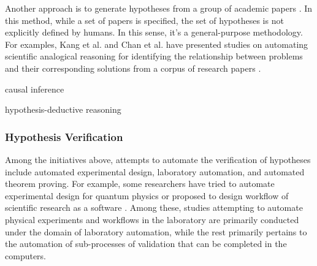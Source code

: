 \documentclass{article}
\begin{document}


Another approach is to generate hypotheses from a group of academic papers \cite{kang2022augmenting,chan2018solvent,wang2023learning,xu2023exploring,yang2023large}. In this method, while a set of papers is specified, the set of hypotheses is not explicitly defined by humans. In this sense, it's a general-purpose methodology. For examples, Kang et al. and Chan et al. have presented studies on automating scientific analogical reasoning for identifying the relationship between problems and their corresponding solutions from a corpus of research papers \cite{kang2022augmenting,chan2018solvent}.

causal inference 

hypothesis-deductive reasoning \cite{vervoort2023criterion}







\subsubsection{Hypothesis Verification}
Among the initiatives above, attempts to automate the verification of hypotheses include automated experimental design, laboratory automation, and automated theorem proving. For example, some researchers have tried to automate experimental design for quantum physics \cite{ruiz2022digital} or proposed to design workflow of scientific research as a software \cite{goble2020fair}. Among these, studies attempting to automate physical experiments and workflows in the laboratory are primarily conducted under the domain of laboratory automation, while the rest primarily pertains to the automation of sub-processes of validation that can be completed in the computers.
\end{document}
